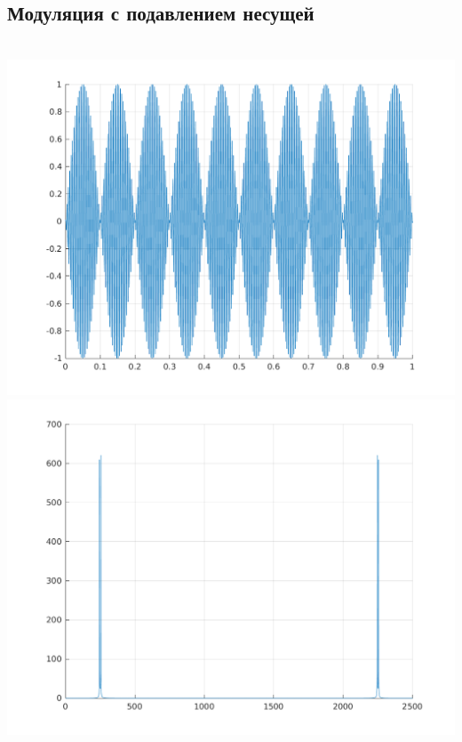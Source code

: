 \documentclass[a4paper]{article}
\begin{document}
\subsection{Модуляция с подавлением несущей}
\\
\includegraphics[scale=0.45]{lab4/figures/figure_5.png}
\includegraphics[scale=0.45]{lab4/figures/figure_6.png}\\
\end{document}
